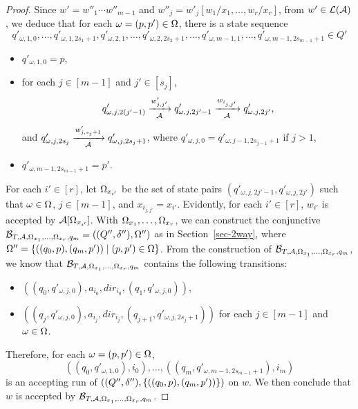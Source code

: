 \begin{proof}
Since $ w' = w''_1 \cdots w''_{m-1}$ and $w''_j = w'_j[w_1/x_1,\ldots, w_r/x_r]$, 
from $w' \in \mathcal{L}(\mathcal{A})$, we deduce that for each $\omega = (p, p') \in \Omega$, there is a state sequence 
%
{\small
$$q'_{\omega, 1, 0}, \ldots, q'_{\omega, 1, 2s_1+1}, q'_{\omega, 2, 1}, \ldots, q'_{\omega, 2, 2s_2+1}, \ldots, q'_{\omega, m-1, 1}, \ldots, q'_{\omega, m-1, 2s_{m-1}+1} \in Q'$$ 
}
%
\begin{itemize}
\item $q'_{\omega,1, 0}= p$, 
%
\item for each $j \in [m-1]$ and $j' \in [s_j]$, 
$$q'_{\omega, j, 2(j'-1)} \xrightarrow[\mathcal{A}]{w'_{j, j'}} q'_{\omega, j, 2j'-1} \xrightarrow[\mathcal{A}]{w_{i_{j, j'}}} q'_{\omega, j, 2j'},$$ 
%
and $q'_{\omega, j, 2s_j} \xrightarrow[\mathcal{A}]{w'_{j, s_j+1}} q'_{\omega, j, 2s_j+1}$,  where $q'_{\omega, j, 0} = q'_{\omega, j-1, 2s_{j-1}+1}$ if $j > 1$, 
%
\item $q'_{\omega, m-1, 2s_{m-1}+1} = p'$.
\end{itemize}
For each $i' \in [r]$, let $\Omega_{x_{i'}}$ be the set of state pairs $(q'_{\omega, j, 2j'-1}, q'_{\omega, j, 2j'})$ such that $\omega \in \Omega$, $j \in [m-1]$, and $x_{i_{j, j'}} = x_{i'}$. Evidently, for each $i' \in [r]$, $w_{i'}$ is accepted by $\mathcal{A}[\Omega_{x_{i'}}]$.
With $\Omega_{x_1}, \ldots, \Omega_{x_r}$, we can construct the conjunctive \SSA{} $\mathcal{B}_{T, \mathcal{A}, \Omega_{x_1}, \ldots, \Omega_{x_r}, q_m} = ((Q'', \delta''), \Omega'')$ as in Section~\ref{sec-2way}, where $\Omega'' = \{((q_0, p), (q_m, p') ) \mid (p, p') \in \Omega\}$. From the construction of $\mathcal{B}_{T, \mathcal{A}, \Omega_{x_1}, \ldots, \Omega_{x_r}, q_m}$, we know that $\mathcal{B}_{T, \mathcal{A}, \Omega_{x_1}, \ldots, \Omega_{x_r}, q_m}$ contains the following transitions: 
\begin{itemize}
\item $((q_0, q'_{\omega, j, 0}), a_{i_0}, dir_{i_0}, (q_1, q'_{\omega, j, 0}))$,
%  
\item $((q_j, q'_{\omega, j, 0}), a_{i_j}, dir_{i_j}, (q_{j+1}, q'_{\omega, j, 2s_{j}+1}))$ for each $j \in [m-1]$ and $\omega \in \Omega$.
\end{itemize}
Therefore, for each $\omega = (p, p') \in \Omega$, 
$$((q_0, q'_{\omega, 1, 0}), i_0), \ldots, ((q_m, q'_{\omega, m-1, 2s_{m-1}+1}), i_m)$$ 
is an accepting run of $((Q'', \delta''), \{((q_0, p), (q_m, p'))\})$ on $w$. 
We then conclude that $w$ is accepted by $\mathcal{B}_{T, \mathcal{A}, \Omega_{x_1}, \ldots, \Omega_{x_r}, q_m}$.


\end{proof}

